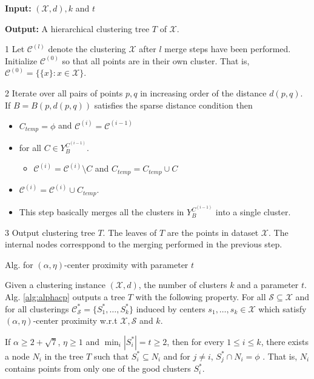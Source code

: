 \documentclass[11pt]{article}
\newcommand{\mc}{\mathcal}
\newenvironment{alg}{
    \begin{list}{}{
        \setlength{\itemsep}{2pt}
        \setlength{\parsep}{0pt}
        \setlength{\parskip}{0pt}
        \setlength{\topsep}{1pt}
    }
}
{
    \end{list}
}
\begin{document}
\begin{algorithm}[!ht]
\begin{alg}
	\item \textbf{Input: } $(\mc X, d), k$ and $t$
	\item \textbf{Output: } A hierarchical clustering tree $T$ of $\mc X$.
	\item[1] Let $\mc C^{(l)}$ denote the clustering $\mc X$ after $l$ merge steps have been performed. Initialize $\mc C^{(0)}$ so that all points are in their own cluster. That is, $\mc C^{(0)} = \{ \{x\}: x \in \mc X\}$.
	\item[2] Iterate over all pairs of points $p, q$ in increasing order of the distance $d(p, q)$. If $B = B(p, d(p, q))$ satisfies the sparse distance condition then
	\begin{itemize}
	\renewcommand\labelitemi{}
		\item $C_{temp} = \phi$ and $\mc C^{(i)} = \mc C^{(i-1)}$
		\item for all $C \in Y_B^{C^{(i-1)}}$.
		\begin{itemize}
		\renewcommand\labelitemii{}
			\item $\mc C^{(i)} = \mc C^{(i)} \setminus C$ and $C_{temp} = C_{temp} \cup C$
		\end{itemize}
		\item $\mc C^{(i)} = \mc C^{(i)} \cup C_{temp}$.
		\item This step basically merges all the clusters in $Y_B^{C^{(i-1)}}$ into a single cluster.
	\end{itemize}
	\item[3] Output clustering tree $T$. The leaves of $T$ are the points in dataset $\mc X$. The internal nodes corresppond to the merging performed in the previous step.
\end{alg}
\caption{Alg. for $(\alpha, \eta)$-center proximity with parameter $t$}
\label{alg:alphacp}
\end{algorithm}


\begin{theorem}
\label{thm:alphacpnoise}
Given a clustering instance $(\mc X, d)$, the number of clusters $k$ and a parameter $t$. Alg. \ref{alg:alphacp} outputs a tree $T$ with the following property. For all $\mc S \subseteq \mc X$ and for all clusterings $\mc C^*_{\mc S} = \{S_1^*, \ldots, S_k^*\}$ induced by centers $s_1, \ldots, s_k \in \mc X$ which satisfy $(\alpha, \eta)$-center proximity w.r.t $\mc X, \mc S$ and $k$. 

If $\alpha \ge 2 + \sqrt 7$, $\eta \ge 1$ and $ \min_i|S_i^*| = t \ge 2$, then for every $1\le i \le k$, there exists a node $N_i$ in the tree $T$ such that $S_i^* \subseteq N_i$ and for $j \neq i$, $S_j^* \cap N_i = \phi$ . That is, $N_i$ contains points from only one of the good clusters $S_i^*$.
\end{theorem}
\end{document}

